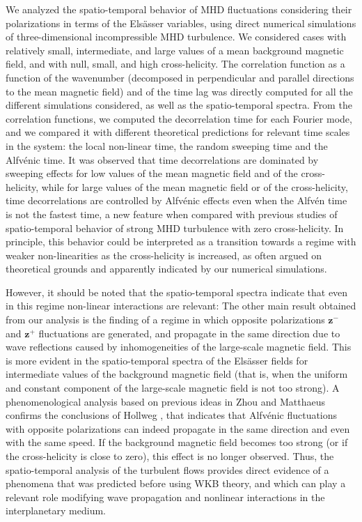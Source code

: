 \documentclass[aip,pop,reprint,amsmath,amssymb,floatfix]{revtex4-1}
\renewcommand{\vec}[1]{\mathbf{#1}}
\begin{document}
We analyzed the spatio-temporal behavior of MHD fluctuations
considering their polarizations in terms of the Els\"asser variables,
using direct numerical simulations of three-dimensional incompressible
MHD turbulence. We considered cases with relatively small,
intermediate, and large values of a mean background magnetic field,
and with null, small, and high cross-helicity. The correlation
function as a function of the wavenumber (decomposed in perpendicular
and parallel directions to the mean magnetic field) and of the time
lag was directly computed for all the different simulations
considered, as well as the spatio-temporal spectra. From the
correlation functions, we computed the decorrelation time for each
Fourier mode, and we compared it with different theoretical
predictions for relevant time scales in the system: the local
non-linear time, the random sweeping time and the Alfv\'enic time. It
was observed that time decorrelations are dominated by sweeping
effects for low values of the mean magnetic field and of the
cross-helicity, while for large values of the mean magnetic field or
of the cross-helicity, time decorrelations are controlled by
Alfv\'enic effects even when the Alfv\'en time is not the fastest
time, a new feature when compared with previous studies of
spatio-temporal behavior of strong MHD turbulence with zero
cross-helicity. In principle, this behavior could be interpreted as a
transition towards a regime with weaker non-linearities as the
cross-helicity is increased, as often argued on theoretical grounds 
and apparently indicated by our numerical simulations.

However, it should be noted that the spatio-temporal spectra indicate
that even in this regime non-linear interactions are relevant: The
other main result obtained from our analysis is the finding of a
regime in which opposite polarizations $\vec{z}^-$ and $\vec{z}^+$
fluctuations are generated, and propagate in the same direction due to
wave reflections caused by inhomogeneities of the large-scale magnetic
field. This is more evident in the spatio-temporal spectra of the
Els\"asser fields for intermediate values of the background magnetic
field (that is, when the uniform and constant component of the
large-scale magnetic field is not too strong). A phenomenological
analysis based on previous ideas in Zhou and Matthaeus
\cite{zhou1990remarks} confirms the conclusions of Hollweg 
\cite{hollweg_1990_wkb}, that indicates that Alfv\'enic fluctuations with
opposite polarizations can indeed propagate in the same direction and
even with the same speed. If the background magnetic field becomes too
strong (or if the cross-helicity is close to zero), this effect is no
longer observed. Thus, the spatio-temporal analysis of the turbulent
flows provides direct evidence of a phenomena that was predicted before 
using WKB theory, and which can play a relevant role modifying wave 
propagation and nonlinear interactions in the interplanetary medium.
\end{document}
